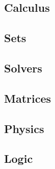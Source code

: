\subsection{Calculus}

\subsection{Sets}


\subsection{Solvers}




\subsection{Matrices}



\subsection{Physics}

\subsection{Logic}

